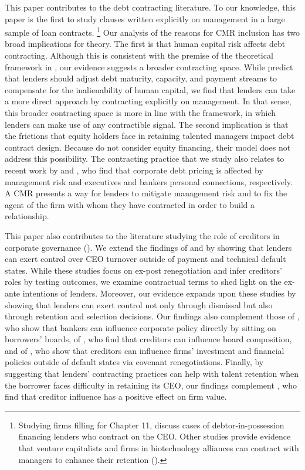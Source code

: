 \documentclass[a4paper,12pt]{article}
\begin{document}
This paper contributes to the debt contracting literature.
To our knowledge, this paper is the first to study clauses written explicitly on management in a large sample of loan contracts.%
    \footnote{Studying firms filling for Chapter 11, \citet{Eckbo_2016} discuss cases of debtor-in-possession financing lenders who contract on the CEO.
    Other studies provide evidence that venture capitalists and firms in biotechnology alliances can contract with managers to enhance their retention (\citet{Kaplan_2003, Robinson_2007}).}
Our analysis of the reasons for CMR inclusion has two broad implications for theory.
The first is that human capital risk affects debt contracting.
Although this is consistent with the premise of the theoretical framework in \citet{Hart_1994}, our evidence suggests a broader contracting space.
While \citet{Hart_1994} predict that lenders should adjust debt maturity, capacity, and payment streams to compensate for the inalienability of human capital, we find that lenders can take a more direct approach by contracting explicitly on management.
In that sense, this broader contracting space is more in line with the \citet{Aghion_1992} framework, in which lenders can make use of any contractible signal.
The second implication is that the frictions that equity holders face in retaining talented managers impact debt contract design.
Because \citet{Hart_1994} do not consider equity financing, their model does not address this possibility.
The contracting practice that we study also relates to recent work by  \citet{Pan_2018} and \citet{Karolyi_2018}, who find that corporate debt pricing is affected by management risk and executives and bankers personal connections, respectively.
A CMR presents a way for lenders to mitigate management risk and to fix the agent of the firm with whom they have contracted in order to build a relationship.




This paper also contributes to the literature studying the role of creditors in corporate governance (\citet{Shleifer_1997, Roberts_2009b}).
We extend the findings of \citet{Gilson_1989} and \citet{Nini_2012} by showing that lenders can exert control over CEO turnover outside of payment and technical default states.
While these studies focus on ex-post renegotiation and infer creditors' roles by testing outcomes, we examine contractual terms to shed light on the ex-ante intentions of lenders.
Moreover, our evidence expands upon these studies by showing that lenders can exert control not only through dismissal but also through retention and selection decisions.
Our findings also complement those of \citet{Kroszner_2001}, who show that bankers can influence corporate policy directly by sitting on borrowers' boards, of \citet{ferreira_2018}, who find that creditors can influence board composition, and of \citet{Denis_2014}, who show that creditors can influence firms' investment and financial policies outside of default states via covenant renegotiations.
Finally, by suggesting that lenders' contracting practices can help with talent retention when the borrower faces difficulty in retaining its CEO, our findings complement \citet{Nini_2012}, who find that creditor influence has a positive effect on firm value.
\end{document}
